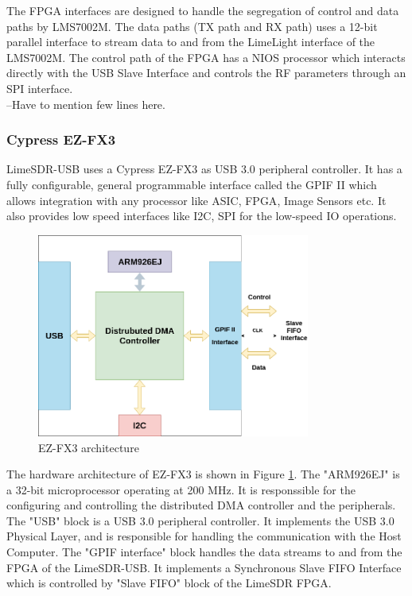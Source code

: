 The \ac{FPGA} interfaces are designed to handle the segregation of control and data paths by LMS7002M.
The data paths (TX path and RX path) uses a 12-bit parallel interface to stream data to and from the LimeLight interface of the LMS7002M.
The control path of the \ac{FPGA} has a NIOS processor which interacts directly with the USB Slave Interface and controls the \ac{RF} parameters through an \ac{SPI} interface.\\

--Have to mention few lines here.


\subsubsection{Cypress EZ-FX3}
LimeSDR-USB uses a Cypress EZ-FX3 as \ac{USB} 3.0 peripheral controller.
It has a fully configurable, general programmable interface called the \ac{GPIF} II which allows integration with any processor like \ac{ASIC}, \ac{FPGA}, Image Sensors etc.
It also provides low speed interfaces like \ac{I2C}, \ac{SPI} for the low-speed \ac{IO} operations.\\

\begin{figure}[h!]
\centering
\hspace*{2.5cm}\includegraphics[width=0.8\textwidth]{Figure/FX3.png}
\caption{EZ-FX3 architecture}
\label{FX3_arch}
\end{figure}
The hardware architecture of EZ-FX3 is shown in Figure \ref{FX3_arch}.
The "ARM926EJ" is a 32-bit microprocessor operating at 200 MHz.
It is responssible for the configuring and controlling the distributed \ac{DMA} controller and the peripherals.
The "USB" block is a \ac{USB} 3.0 peripheral controller.
It implements the \ac{USB} 3.0 Physical Layer, and is responsible for handling the communication with the Host Computer.
The "\ac{GPIF} interface" block handles the data streams to and from the \ac{FPGA} of the LimeSDR-USB. 
It implements a Synchronous Slave FIFO Interface which is controlled by "Slave FIFO" block of the LimeSDR \ac{FPGA}.\\

